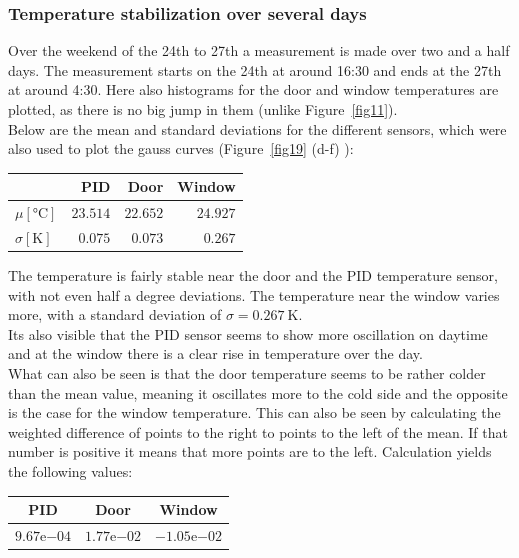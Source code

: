 \documentclass[12pt]{scrartcl}
\begin{document}
      \subsubsection{Temperature stabilization over several days}
      Over the weekend of the 24th to 27th a measurement is made over two
      and a half days. The measurement starts on the 24th at around 16:30 and
      ends at the 27th at around 4:30. Here also histograms for the
      door and window temperatures are plotted, as there is no big jump in them (unlike
      Figure~\ref{fig11}).\\
      Below are the mean and standard deviations for the different sensors, which
      were also used to plot the gauss curves (Figure~\ref{fig19} (d-f) ):
      \\
      \begin{table}[H]
        \begin{tabular}{l | r | r | r}
          & PID & Door & Window \\
          \hline
          $\mu[\text{°C}]$ & $23.514$ & $22.652$ & $24.927$ \\
          $\sigma[\text{K}]$ & $0.075$ & $0.073$ & $0.267$
        \end{tabular}
      \end{table}
      The temperature is fairly stable near the door and the PID
      temperature sensor, with
      not even half a degree deviations. The temperature near the window varies
      more, with a standard deviation of $\sigma = 0.267~\text{K}$.\\
      Its also visible that the PID sensor seems to show more oscillation on
      daytime and at the window there is a clear rise in temperature over the day.
      \\What can also be seen is that the door temperature seems to be rather
      colder than the mean value, meaning it oscillates more to the cold side
      and the opposite is the case for the window temperature. This can also be
      seen by calculating the weighted difference of points to the right to
      points to the left of the mean. If that number is positive it means that
      more points are to the left.
      Calculation yields the following values: \vspace{-5pt}
      \begin{table}[H]
        \begin{tabular}{c | c | c}
          PID & Door & Window \\
          \hline
          $9.67\mathrm{e}{-04}$ & $1.77\mathrm{e}{-02}$ & $-1.05\mathrm{e}{-02}$
        \end{tabular}
      \end{table}
\end{document}
